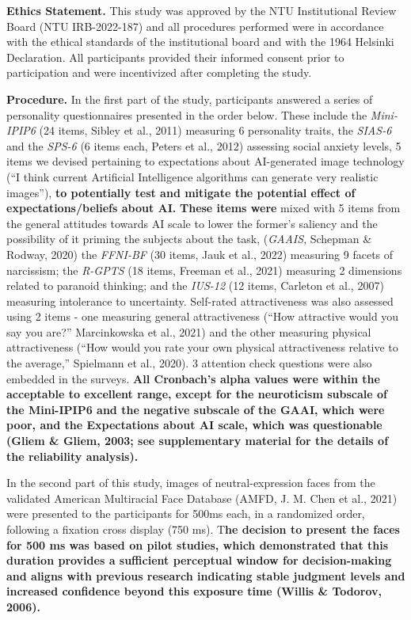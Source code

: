 \documentclass[
  man,
  floatsintext,
  longtable,
  nolmodern,
  notxfonts,
  notimes,
  colorlinks=true,linkcolor=blue,citecolor=blue,urlcolor=blue]{apa7}
\begin{document}
\textbf{Ethics Statement.} This study was approved by the NTU
Institutional Review Board (NTU IRB-2022-187) and all procedures
performed were in accordance with the ethical standards of the
institutional board and with the 1964 Helsinki Declaration. All
participants provided their informed consent prior to participation and
were incentivized after completing the study.

\textbf{Procedure.} In the first part of the study, participants
answered a series of personality questionnaires presented in the order
below. These include the \emph{Mini-IPIP6} (24 items, Sibley et al.,
2011) measuring 6 personality traits, the \emph{SIAS-6} and the
\emph{SPS-6} (6 items each, Peters et al., 2012) assessing social
anxiety levels, 5 items we devised pertaining to expectations about
AI-generated image technology (``I think current Artificial Intelligence
algorithms can generate very realistic images''), \textbf{to potentially
test and mitigate the potential effect of expectations/beliefs about
AI.} \textbf{These items were} mixed with 5 items from the general
attitudes towards AI scale to lower the former's saliency and the
possibility of it priming the subjects about the task, (\emph{GAAIS},
Schepman \& Rodway, 2020) the \emph{FFNI-BF} (30 items, Jauk et al.,
2022) measuring 9 facets of narcissism; the \emph{R-GPTS} (18 items,
Freeman et al., 2021) measuring 2 dimensions related to paranoid
thinking; and the \emph{IUS-12} (12 items, Carleton et al., 2007)
measuring intolerance to uncertainty. Self-rated attractiveness was also
assessed using 2 items - one measuring general attractiveness (``How
attractive would you say you are?'' Marcinkowska et al., 2021) and the
other measuring physical attractiveness (``How would you rate your own
physical attractiveness relative to the average,'' Spielmann et al.,
2020). 3 attention check questions were also embedded in the surveys.
\textbf{All Cronbach's alpha values were within the acceptable to
excellent range, except for the neuroticism subscale of the Mini-IPIP6
and the negative subscale of the GAAI, which were poor, and the
Expectations about AI scale, which was questionable (Gliem \& Gliem,
2003; see supplementary material for the details of the reliability
analysis).}

In the second part of this study, images of neutral-expression faces
from the validated American Multiracial Face Database (AMFD, J. M. Chen
et al., 2021) were presented to the participants for 500ms each, in a
randomized order, following a fixation cross display (750 ms).
T\textbf{he decision to present the faces for 500 ms was based on pilot
studies, which demonstrated that this duration provides a sufficient
perceptual window for decision-making and aligns with previous research
indicating stable judgment levels and increased confidence beyond this
exposure time (Willis \& Todorov, 2006).}
\end{document}
